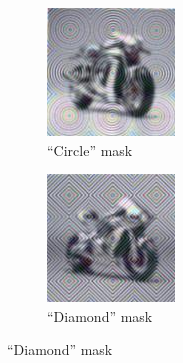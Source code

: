 \documentclass[a4paper, oneside]{discothesis}
\begin{document}

\begin{figure}[th]
	\begin{subfigure}[t]{0.19\textwidth}\centering\includegraphics[width=\linewidth]{figures/hcaptcha-circle.png}\caption{``Circle'' mask}\label{fig:subfig1}\end{subfigure}
	\hfill
	\begin{subfigure}[t]{0.19\textwidth}\centering\includegraphics[width=\linewidth]{figures/hcaptcha-diamond.png}\caption{``Diamond'' mask}\label{fig:subfig2}\end{subfigure}

\end{figure}
\end{document}
